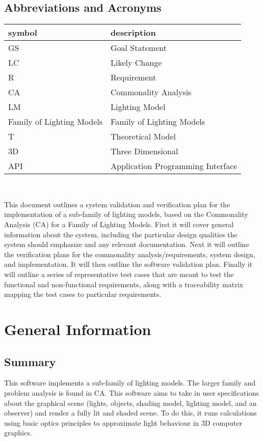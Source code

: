 \documentclass[12pt, titlepage]{article}
\newcommand{\famname}{Family of Lighting Models} %
\begin{document}
\subsection{Abbreviations and Acronyms}

\renewcommand{\arraystretch}{1.2}
\begin{tabular}{l l} 
	\toprule		
	\textbf{symbol} & \textbf{description}\\
	\midrule 
	GS & Goal Statement\\
	LC & Likely Change\\
	R & Requirement\\
	CA & Commonality Analysis \\
	LM & Lighting Model\\
	\famname{} & \famname{}\\
	T & Theoretical Model\\
	3D & Three Dimensional \\
	API & Application Programming Interface \\
	\bottomrule
\end{tabular}\\

\newpage


This document outlines a system validation and verification plan for the
implementation of a sub-family of lighting models, based on the Commonality
Analysis (CA) for a Family of Lighting Models. 
First it will cover general information about the system, including the
particular design qualities the system should emphasize and any relevant
documentation. Next it will outline the verification plans for the commonality
analysis/requirements, system design, and implementation. It will then outline
the software validation plan.  Finally it will outline a series of
representative test cases that are meant to test the functional and
non-functional requirements, along with a traceability matrix mapping the test
cases to particular requirements.

\section{General Information}

\subsection{Summary}
This software implements a sub-family of lighting models. The larger family and 
problem analysis is found in CA. This software aims to take in user 
specifications about the graphical scene (lights, objects, shading model, 
lighting model, and an observer) and render a fully lit and shaded scene. To do 
this, it runs calculations using basic optics principles to approximate light 
behaviour in 3D computer graphics.
\end{document}
